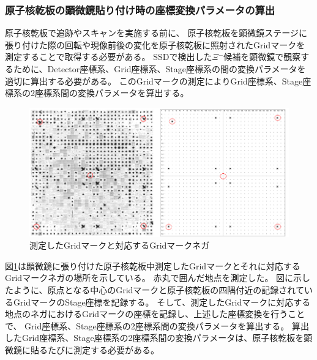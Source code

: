 \documentclass[12pt,a4paper]{jarticle}
\begin{document}
\subsubsection{原子核乾板の顕微鏡貼り付け時の座標変換パラメータの算出}
原子核乾板で追跡やスキャンを実施する前に、
原子核乾板を顕微鏡ステージに張り付けた際の回転や現像前後の変化を原子核乾板に照射されたGridマークを測定することで取得する必要がある。
SSDで検出した$\Xi$$^-$候補を顕微鏡で観察するために、Detector座標系、Grid座標系、Stage座標系の間の変換パラメータを適切に算出する必要がある。
このGridマークの測定によりGrid座標系、Stage座標系の2座標系間の変換パラメータを算出する。
\begin{figure}[htbp]
  \centering
     \includegraphics[width=140mm]{grid2stage.png}
  \caption{測定したGridマークと対応するGridマークネガ\label{fig:grid2stage}}
\end{figure}
\par
図\ref{fig:grid2stage}は顕微鏡に張り付けた原子核乾板中測定したGridマークとそれに対応するGridマークネガの場所を示している。
赤丸で囲んだ地点を測定した。
図に示したように、原点となる中心のGridマークと原子核乾板の四隅付近の記録されているGridマークのStage座標を記録する。
そして、測定したGridマークに対応する地点のネガにおけるGridマークの座標を記録し、上述した座標変換を行うことで、
Grid座標系、Stage座標系の2座標系間の変換パラメータを算出する。
算出したGrid座標系、Stage座標系の2座標系間の変換パラメータは、原子核乾板を顕微鏡に貼るたびに測定する必要がある。
\newpage
\end{document}
